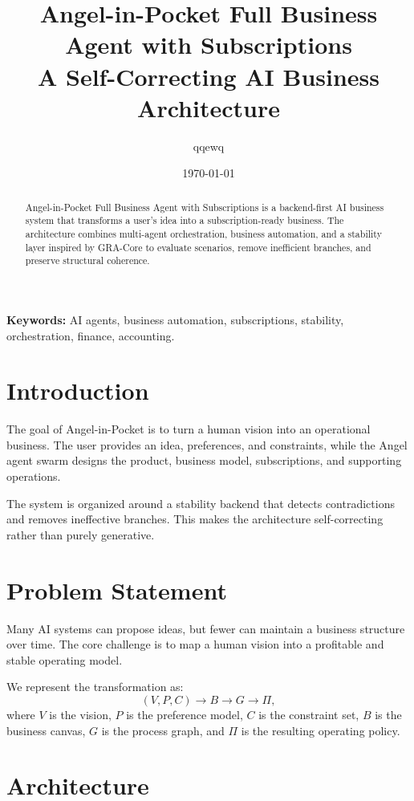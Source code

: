 \documentclass[11pt,a4paper]{article}
\title{Angel-in-Pocket Full Business Agent with Subscriptions\\
A Self-Correcting AI Business Architecture}
\author{qqewq}
\date{\today}
\begin{document}
\maketitle

\begin{abstract}
Angel-in-Pocket Full Business Agent with Subscriptions is a backend-first AI business system that transforms a user's idea into a subscription-ready business. The architecture combines multi-agent orchestration, business automation, and a stability layer inspired by GRA-Core to evaluate scenarios, remove inefficient branches, and preserve structural coherence.
\end{abstract}

\noindent\textbf{Keywords:} AI agents, business automation, subscriptions, stability, orchestration, finance, accounting.

\section{Introduction}

The goal of Angel-in-Pocket is to turn a human vision into an operational business. The user provides an idea, preferences, and constraints, while the Angel agent swarm designs the product, business model, subscriptions, and supporting operations.

The system is organized around a stability backend that detects contradictions and removes ineffective branches. This makes the architecture self-correcting rather than purely generative.

\section{Problem Statement}

Many AI systems can propose ideas, but fewer can maintain a business structure over time. The core challenge is to map a human vision into a profitable and stable operating model.

We represent the transformation as:
\[
(V, P, C) \rightarrow B \rightarrow G \rightarrow \Pi,
\]
where $V$ is the vision, $P$ is the preference model, $C$ is the constraint set, $B$ is the business canvas, $G$ is the process graph, and $\Pi$ is the resulting operating policy.

\section{Architecture}
\end{document}

